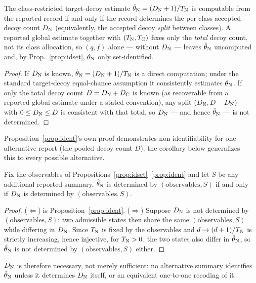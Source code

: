 \begin{proposition}[reconstructibility]\label{prop:ident}
The class-restricted target-decoy estimate $\hat{\theta}_{\mathrm{N}}=(D_{\mathrm{N}}+1)/T_{\mathrm{N}}$ is computable from the reported record if and only if the record determines the per-class accepted decoy count $D_{\mathrm{N}}$ (equivalently, the accepted decoy \emph{split} between classes). A reported global estimate together with $(T_{\mathrm{N}},T_{\mathrm{C}})$ fixes only the \emph{total} decoy count, not its class allocation, so $(q,f)$ alone --- without $D_{\mathrm{N}}$ --- leaves $\hat{\theta}_{\mathrm{N}}$ uncomputed and, by Prop.~\ref{prop:idset}, $\theta_{\mathrm{N}}$ only set-identified.
\end{proposition}
\begin{proof}
If $D_{\mathrm{N}}$ is known, $\hat{\theta}_{\mathrm{N}}=(D_{\mathrm{N}}+1)/T_{\mathrm{N}}$ is a direct computation; under the standard target-decoy equal-chance assumption it consistently estimates $\theta_{\mathrm{N}}$. If only the total decoy count $D=D_{\mathrm{N}}+D_{\mathrm{C}}$ is known (as recoverable from a reported global estimate under a stated convention), any split $(D_{\mathrm{N}},D-D_{\mathrm{N}})$ with $0\le D_{\mathrm{N}}\le D$ is consistent with that total, so $D_{\mathrm{N}}$ --- and hence $\hat{\theta}_{\mathrm{N}}$ --- is not determined.
\end{proof}

\noindent Proposition~\ref{prop:ident}'s own proof demonstrates non-identifiability for one alternative report (the pooled decoy count $D$); the corollary below generalizes this to every possible alternative.

\begin{corollary}\label{cor:necessity}
Fix the observables of Propositions~\ref{prop:idset}--\ref{prop:ident} and let $S$ be any additional reported summary. $\hat{\theta}_{\mathrm{N}}$ is determined by $(\text{observables},S)$ if and only if $D_{\mathrm{N}}$ is determined by $(\text{observables},S)$.
\end{corollary}
\begin{proof}
($\Leftarrow$) is Proposition~\ref{prop:ident}. ($\Rightarrow$) Suppose $D_{\mathrm{N}}$ is not determined by $(\text{observables},S)$: two admissible states then share the same $(\text{observables},S)$ while differing in $D_{\mathrm{N}}$. Since $T_{\mathrm{N}}$ is fixed by the observables and $d\mapsto(d+1)/T_{\mathrm{N}}$ is strictly increasing, hence injective, for $T_{\mathrm{N}}>0$, the two states also differ in $\hat{\theta}_{\mathrm{N}}$, so $\hat{\theta}_{\mathrm{N}}$ is not determined by $(\text{observables},S)$ either.
\end{proof}
\noindent $D_{\mathrm{N}}$ is therefore necessary, not merely sufficient: no alternative summary identifies $\hat{\theta}_{\mathrm{N}}$ unless it determines $D_{\mathrm{N}}$ itself, or an equivalent one-to-one recoding of it.

